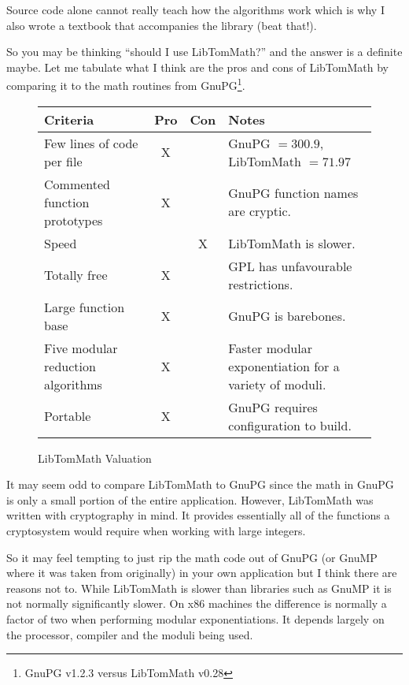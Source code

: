 \documentclass[synpaper]{book}
\begin{document}
Source code alone cannot really teach how the algorithms work which is why I also wrote a textbook that accompanies
the library (beat that!).

So you may be thinking ``should I use LibTomMath?'' and the answer is a definite maybe.  Let me tabulate what I think
are the pros and cons of LibTomMath by comparing it to the math routines from GnuPG\footnote{GnuPG v1.2.3 versus LibTomMath v0.28}.

\newpage\begin{figure}[h]
\begin{small}
\begin{center}
\begin{tabular}{|l|c|c|l|}
\hline \textbf{Criteria} & \textbf{Pro} & \textbf{Con} & \textbf{Notes} \\
\hline Few lines of code per file & X & & GnuPG $ = 300.9$, LibTomMath  $ = 71.97$ \\
\hline Commented function prototypes & X && GnuPG function names are cryptic. \\
\hline Speed && X & LibTomMath is slower.  \\
\hline Totally free & X & & GPL has unfavourable restrictions.\\
\hline Large function base & X & & GnuPG is barebones. \\
\hline Five modular reduction algorithms & X & & Faster modular exponentiation for a variety of moduli. \\
\hline Portable & X & & GnuPG requires configuration to build. \\
\hline
\end{tabular}
\end{center}
\end{small}
\caption{LibTomMath Valuation}
\end{figure}

It may seem odd to compare LibTomMath to GnuPG since the math in GnuPG is only a small portion of the entire application.
However, LibTomMath was written with cryptography in mind.  It provides essentially all of the functions a cryptosystem
would require when working with large integers.

So it may feel tempting to just rip the math code out of GnuPG (or GnuMP where it was taken from originally) in your
own application but I think there are reasons not to.  While LibTomMath is slower than libraries such as GnuMP it is
not normally significantly slower.  On x86 machines the difference is normally a factor of two when performing modular
exponentiations.  It depends largely on the processor, compiler and the moduli being used.
\end{document}
